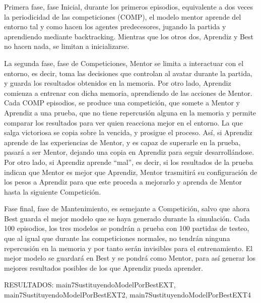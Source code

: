 Primera fase, fase Inicial, durante los primeros episodios, equivalente a dos veces la periodicidad de las competiciones (COMP), el modelo mentor aprende del entorno tal y como hacen los agentes predecesores, jugando la partida y aprendiendo mediante backtracking. Mientras que los otros dos, Aprendiz y Best no hacen nada, se limitan a inicializarse.

La segunda fase, fase de Competiciones, Mentor se limita a interactuar con el entorno, es decir, toma las decisiones que controlan al avatar durante la partida, y guarda los resultados obtenidos en la memoria. Por otro lado, Aprendiz comienza a entrenar con dicha memoria, aprendiendo de las acciones de Mentor.
Cada COMP episodios, se produce una competición, que somete a Mentor y Aprendiz a una prueba, que no tiene repercusión alguna en la memoria y permite comparar los resultados para ver quien reacciona mejor en el entorno. La que salga victoriosa se copia sobre la vencida, y prosigue el proceso.
Así, si Aprendiz aprende de las experiencias de Mentor, y es capaz de superarle en la prueba, pasará a ser Mentor, dejando una copia en Aprendiz para seguir desarrollándose. Por otro lado, si Aprendiz aprende “mal”, es decir, si los resultados de la prueba indican que Mentor es mejor que Aprendiz, Mentor trasmitirá su configuración de los pesos a Aprendiz para que este proceda a mejorarlo y aprenda de Mentor hasta la siguiente Competición.  

Fase final, fase de Mantenimiento, es semejante a Competición, salvo que ahora Best guarda el mejor modelo que se haya generado durante la simulación. Cada 100 episodios, los tres modelos se pondrán a prueba con 100 partidas de testeo, que al igual que durante las competiciones normales, no tendrán ninguna repercusión en la memoria y por tanto serán invisibles para el entrenamiento. El mejor modelo se guardará en Best y se pondrá como Mentor, para así generar los mejores resultados posibles de los que Aprendiz pueda aprender.  

RESULTADOS: 	main7SustituyendoModelPorBestEXT, main7SustituyendoModelPorBestEXT2, main7SustituyendoModelPorBestEXT4



